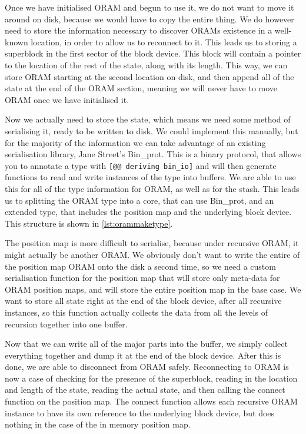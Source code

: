 \documentclass[12pt,a4paper,twoside,openright]{report}
\begin{document}
Once we have initialised ORAM and begun to use it, we do not want to move it around on disk, because we would have to copy the entire thing. We do however need to store the information necessary to discover ORAMs existence in a well-known location, in order to allow us to reconnect to it. This leads us to storing a superblock in the first sector of the block device. This block will contain a pointer to the location of the rest of the state, along with its length. This way, we can store ORAM starting at the second location on disk, and then append all of the state at the end of the ORAM section, meaning we will never have to move ORAM once we have initialised it.

Now we actually need to store the state, which means we need some method of serialising it, ready to be written to disk. We could implement this manually, but for the majority of the information we can take advantage of an existing serialisation library, Jane Street's Bin\_prot. This is a binary protocol, that allows you to annotate a type with \texttt{[@@ deriving bin\_io]} and will then generate functions to read and write instances of the type into buffers. We are able to use this for all of the type information for ORAM, as well as for the stash. This leads us to splitting the ORAM type into a core, that can use Bin\_prot, and an extended type, that includes the position map and the underlying block device. This structure is shown in \cref{lst:orammaketype}.

The position map is more difficult to serialise, because under recursive ORAM, it might actually be another ORAM. We obviously don't want to write the entire of the position map ORAM onto the disk a second time, so we need a custom serialisation function for the position map that will store only meta-data for ORAM position maps, and will store the entire position map in the base case. We want to store all state right at the end of the block device, after all recursive instances, so this function actually collects the data from all the levels of recursion together into one buffer.

Now that we can write all of the major parts into the buffer, we simply collect everything together and dump it at the end of the block device. After this is done, we are able to disconnect from ORAM safely. Reconnecting to ORAM is now a case of checking for the presence of the superblock, reading in the location and length of the state, reading the actual state, and then calling the connect function on the position map. The connect function allows each recursive ORAM instance to have its own reference to the underlying block device, but does nothing in the case of the in memory position map.
\end{document}
